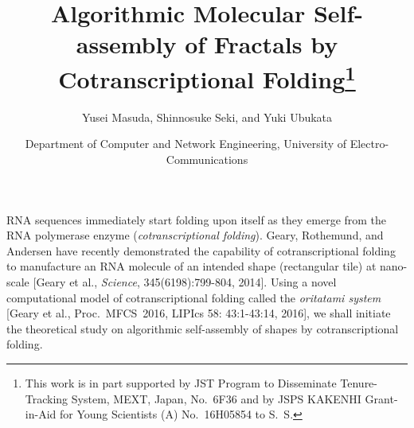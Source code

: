 \documentclass[11pt]{article}
\title{Algorithmic Molecular Self-assembly of Fractals by Cotranscriptional Folding\footnote{This work is in part supported by JST Program to Disseminate Tenure-Tracking System, MEXT, Japan, No.~6F36 and by JSPS KAKENHI Grant-in-Aid for Young Scientists (A) No.~16H05854 to S.~S.}}
\author{Yusei Masuda, Shinnosuke Seki, and Yuki Ubukata}
\date{Department of Computer and Network Engineering, University of Electro-Communications}
\begin{document}
\maketitle

\thispagestyle{empty}

RNA sequences immediately start folding upon itself as they emerge from the RNA polymerase enzyme (\textit{cotranscriptional folding}). 
Geary, Rothemund, and Andersen have recently demonstrated the capability of cotranscriptional folding to manufacture an RNA molecule of an intended shape (rectangular tile) at nano-scale [Geary et al., \textit{Science}, 345(6198):799-804, 2014]. 
Using a novel computational model of cotranscriptional folding called the \textit{oritatami system} [Geary et al., Proc.~MFCS~2016, LIPIcs 58: 43:1-43:14, 2016], we shall initiate the theoretical study on algorithmic self-assembly of shapes by cotranscriptional folding. 
\end{document}
